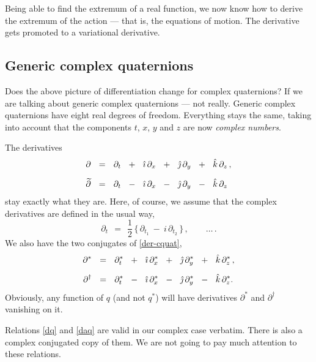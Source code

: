 \documentclass[epsfig,12pt]{article}
\newcommand{\p}{\partial}
\newcommand{\wt}{\widetilde}
\newcommand{\ii}{\hat\imath}
\newcommand{\jj}{\hat\jmath}
\newcommand{\kk}{\hat k}
\begin{document}
	Being able to find the extremum of a real function, we now know how to derive the
	extremum of the action --- that is, the equations of motion.
	The derivative gets promoted to a variational derivative.


\subsection{Generic complex quaternions}
\label{sec-cpx-quat}
	
	Does the above picture of differentiation change for complex quaternions?
	If we are talking about generic complex quaternions --- not really.
	Generic complex quaternions have eight real degrees of freedom.
	Everything stays the same, taking into account that the components $ t $, $ x $, $ y $ 
	and $ z $ are now \emph{complex numbers}.

	The derivatives
\begin{align}
%
\notag
	\p	& ~~=~~	\p_t  ~~+~~  \ii\,\p_x  ~~+~~  \jj\,\p_y  ~~+~~  \kk\,\p_z\,,
	\\[2mm]
%
\label{der-cquat}
	\wt\p	& ~~=~~	\p_t  ~~-~~  \ii\,\p_x  ~~-~~  \jj\,\p_y  ~~-~~  \kk\,\p_z
\end{align}
	stay exactly what they are.
	Here, of course, we assume that the complex derivatives are defined in the usual way,
\begin{equation}
	\p_t	~~=~~	\frac 1 2\, \big\{\, \p_{t_1}  ~-~ i\,\p_{t_2}\,\big\} \,,\qquad	\dots\,.
\end{equation}
	We also have the two conjugates of \eqref{der-cquat},
\begin{align}
%
\notag
	\p^*		& ~~=~~	\p_t^*  ~~+~~  \ii\,\p_x^*  ~~+~~  \jj\,\p_y^*  ~~+~~  \kk\,\p_z^*\,,
	\\[2mm]
%
\label{der-cquat-conj}
	\p^\dag	& ~~=~~	\p_t^*  ~~-~~  \ii\,\p_x^*  ~~-~~  \jj\,\p_y^*  ~~-~~  \kk\,\p_z^*.
\end{align}
	Obviously, any function of $ q $ (and not $ q^* $) will have 
	derivatives $ \p^* $ and $ \p^\dag $ vanishing on it.

	Relations \eqref{dq} and \eqref{daq} are valid in our complex case
	verbatim.
	There is also a complex conjugated copy of them.
	We are not going to pay much attention to these relations.
\end{document}
